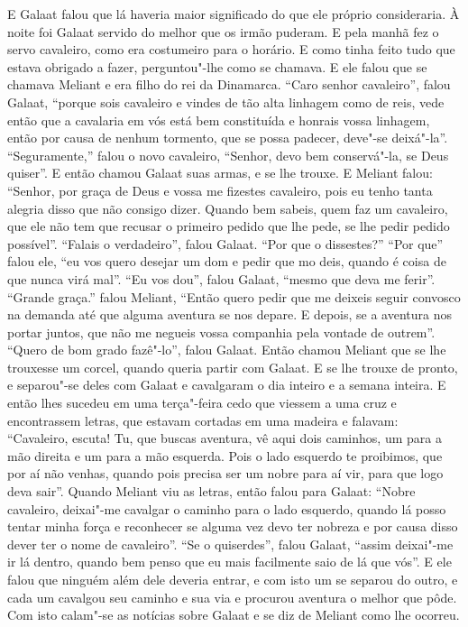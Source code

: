 E Galaat falou que lá haveria maior significado do que ele próprio consideraria.
À noite foi Galaat servido do melhor que os irmão puderam. E pela manhã fez o
servo cavaleiro, como era costumeiro para o horário. E como tinha feito tudo
que estava obrigado a fazer, perguntou"-lhe como se chamava. E ele falou que se
chamava Meliant e era filho do rei da Dinamarca. “Caro senhor cavaleiro”, falou
Galaat, “porque sois cavaleiro e vindes de tão alta linhagem como de reis, vede
então que a cavalaria em vós está bem constituída e honrais vossa linhagem,
então por causa de nenhum tormento, que se possa padecer, deve"-se deixá"-la''.
“Seguramente,” falou o novo cavaleiro, “Senhor, devo bem conservá"-la, se Deus
quiser”. E então chamou Galaat suas armas, e se lhe trouxe. E Meliant falou:
“Senhor, por graça de Deus e vossa me fizestes cavaleiro, pois eu tenho tanta
alegria disso que não consigo dizer. Quando bem sabeis, quem faz um cavaleiro,
que ele não tem que recusar o primeiro pedido que lhe pede, se lhe pedir pedido
possível”. “Falais o verdadeiro”, falou Galaat. “Por que o dissestes?” “Por
que” falou ele, “eu vos quero desejar um dom e pedir que mo deis, quando é
coisa de que nunca virá mal”. “Eu vos dou”, falou Galaat, “mesmo que deva me
ferir”. “Grande graça.” falou Meliant, “Então quero pedir que me
deixeis seguir convosco na demanda até que alguma aventura se nos depare. E
depois, se a aventura nos portar juntos, que não me negueis vossa companhia
pela vontade de outrem”. “Quero de bom grado fazê"-lo”, falou Galaat. Então
chamou Meliant que se lhe trouxesse um corcel, quando queria partir com Galaat.
E se lhe trouxe de pronto, e separou"-se deles com Galaat e cavalgaram o dia
inteiro e a semana inteira. E então lhes sucedeu em uma terça"-feira cedo que
viessem a uma cruz e encontrassem letras,  que estavam cortadas em uma madeira
e falavam: “Cavaleiro, escuta! Tu, que buscas aventura, vê aqui dois caminhos,
um para a mão direita e um para a mão esquerda. Pois o lado esquerdo te
proibimos, que por aí não venhas, quando pois precisa ser um nobre para aí vir,
para que logo deva sair”. Quando Meliant viu as letras, então falou para
Galaat: “Nobre cavaleiro, deixai"-me cavalgar o caminho para o lado esquerdo,
quando lá posso tentar minha força e reconhecer se alguma vez devo ter nobreza
e por causa disso dever ter o nome de cavaleiro”. “Se o quiserdes”,
falou Galaat, “assim deixai"-me ir lá dentro, quando bem penso que eu mais
facilmente saio de lá que vós”. E ele falou que ninguém além dele deveria
entrar, e com isto um se separou do outro, e cada um cavalgou seu caminho e sua
via e procurou aventura o melhor que pôde. Com isto calam"-se as notícias sobre
Galaat e se diz de Meliant como lhe ocorreu.

